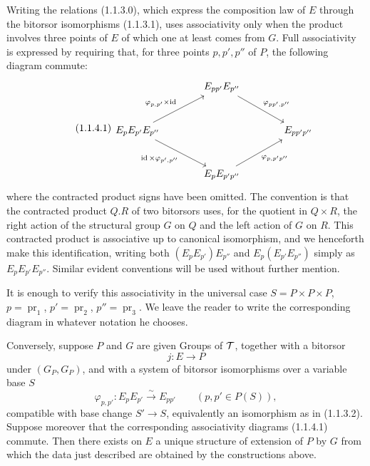 \documentclass[11pt]{article}
\providecommand{\pr}{\operatorname{pr}}
\providecommand{\id}{\operatorname{id}}
\begin{document}
Writing the relations (1.1.3.0), which express the composition law of \(E\) through the bitorsor isomorphisms (1.1.3.1), uses associativity only when the product involves three points of \(E\) of which one at least comes from \(G\).  Full associativity is expressed by requiring that, for three points \(p,p',p''\) of \(P\), the following diagram commute:
\begin{equation}\tag{1.1.4.1}
\begin{tikzcd}[column sep=large,row sep=large]
& E_{pp'}E_{p''}\arrow[dr,"\varphi_{pp',p''}"]&\\
E_pE_{p'}E_{p''}\arrow[ur,"\varphi_{p,p'}\times\id"]\arrow[dr,"\id\times\varphi_{p',p''}"']&&E_{pp'p''}\\
& E_pE_{p'p''}\arrow[ur,"\varphi_{p,p'p''}"']&
\end{tikzcd}
\end{equation}
where the contracted product signs have been omitted.  The convention is that the contracted product \(Q.R\) of two bitorsors uses, for the quotient in \(Q\times R\), the right action of the structural group \(G\) on \(Q\) and the left action of \(G\) on \(R\).  This contracted product is associative up to canonical isomorphism, and we henceforth make this identification, writing both \((E_pE_{p'})E_{p''}\) and \(E_p(E_{p'}E_{p''})\) simply as \(E_pE_{p'}E_{p''}\).  Similar evident conventions will be used without further mention.

It is enough to verify this associativity in the universal case \(S=P\times P\times P\), \(p=\pr_1\), \(p'=\pr_2\), \(p''=\pr_3\).  We leave the reader to write the corresponding diagram in whatever notation he chooses.

Conversely, suppose \(P\) and \(G\) are given Groups of \(\mathcal T\), together with a bitorsor
\begin{equation}\tag{1.1.5.1}
  j:E\longrightarrow P
\end{equation}
under \((G_P,G_P)\), and with a system of bitorsor isomorphisms over a variable base \(S\)
\begin{equation}\tag{1.1.5.2}
  \varphi_{p,p'}:E_pE_{p'}\xrightarrow{\sim}E_{pp'}
  \qquad (p,p'\in P(S)),
\end{equation}
compatible with base change \(S'\to S\), equivalently an isomorphism as in (1.1.3.2).  Suppose moreover that the corresponding associativity diagrams (1.1.4.1) commute.  Then there exists on \(E\) a unique structure of extension of \(P\) by \(G\) from which the data just described are obtained by the constructions above.
\end{document}
